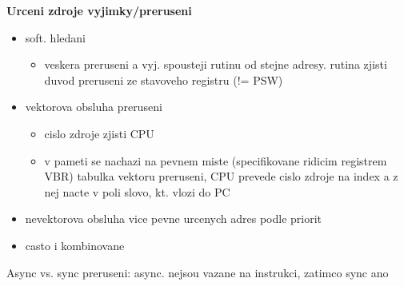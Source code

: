 \documentclass[10pt]{article}
\begin{document}
\textbf{Urceni zdroje vyjimky/preruseni}\\
\begin{itemize}
\item soft. hledani \begin{itemize}
	\item veskera preruseni a vyj. spousteji rutinu od stejne adresy. rutina zjisti duvod preruseni ze stavoveho registru (!= PSW)
	\end{itemize}
\item vektorova obsluha preruseni \begin{itemize}
	\item cislo zdroje zjisti CPU
	\item v pameti se nachazi na pevnem miste (specifikovane ridicim registrem VBR) tabulka vektoru preruseni, CPU prevede cislo zdroje na index a z nej nacte v poli slovo, kt. vlozi do PC
	\end{itemize}
\item nevektorova obsluha vice pevne urcenych adres podle priorit
\item casto i kombinovane
\end{itemize}

Async vs. sync preruseni: async. nejsou vazane na instrukci, zatimco sync ano
\end{document}

